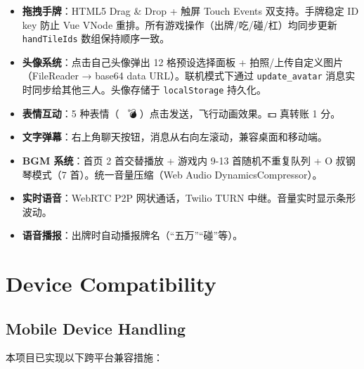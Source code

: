 \documentclass[11pt,a4paper]{article}
\begin{document}
\begin{itemize}[nosep]
  \item \textbf{拖拽手牌}：HTML5 Drag \& Drop + 触屏 Touch Events 双支持。手牌稳定 ID key 防止 Vue VNode 重排。所有游戏操作（出牌/吃/碰/杠）均同步更新 \texttt{handTileIds} 数组保持顺序一致。
  \item \textbf{头像系统}：点击自己头像弹出 12 格预设选择面板 + 拍照/上传自定义图片（FileReader → base64 data URL）。联机模式下通过 \texttt{update\_avatar} 消息实时同步给其他三人。头像存储于 \texttt{localStorage} 持久化。
  \item \textbf{表情互动}：5 种表情（🌹💩🥚💣💵）点击发送，飞行动画效果。💵 真转账 1 分。
  \item \textbf{文字弹幕}：右上角聊天按钮，消息从右向左滚动，兼容桌面和移动端。
  \item \textbf{BGM 系统}：首页 2 首交替播放 + 游戏内 9-13 首随机不重复队列 + O 叔钢琴模式（7 首）。统一音量压缩（Web Audio DynamicsCompressor）。
  \item \textbf{实时语音}：WebRTC P2P 网状通话，Twilio TURN 中继。音量实时显示条形波动。
  \item \textbf{语音播报}：出牌时自动播报牌名（``五万''``碰''等）。
\end{itemize}

\section{Device Compatibility}

\subsection{Mobile Device Handling}

本项目已实现以下跨平台兼容措施：
\end{document}
